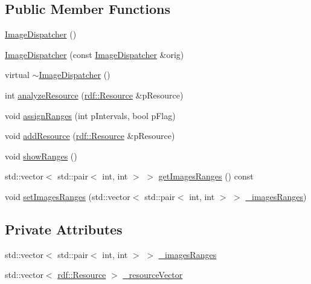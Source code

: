 \subsection*{Public Member Functions}
\begin{DoxyCompactItemize}
\item 
\hyperlink{classrdf_1_1ImageDispatcher_a32ca43231de0932370b3b5a98f76f5b5}{Image\+Dispatcher} ()
\item 
\hyperlink{classrdf_1_1ImageDispatcher_a75d599869487a60fcaf0269f77f2c049}{Image\+Dispatcher} (const \hyperlink{classrdf_1_1ImageDispatcher}{Image\+Dispatcher} \&orig)
\item 
virtual \hyperlink{classrdf_1_1ImageDispatcher_ab7a10dc991075876919a0d657251c808}{$\sim$\+Image\+Dispatcher} ()
\item 
int \hyperlink{classrdf_1_1ImageDispatcher_a0fe89ed7467fd34e1e24984b87d6d3bc}{analyze\+Resource} (\hyperlink{classrdf_1_1Resource}{rdf\+::\+Resource} \&p\+Resource)
\item 
void \hyperlink{classrdf_1_1ImageDispatcher_a10e89cb9630fe93877a23f485d2a1213}{assign\+Ranges} (int p\+Intervals, bool p\+Flag)
\item 
void \hyperlink{classrdf_1_1ImageDispatcher_a900b639d7be2ac5e4e48b5a7aa879182}{add\+Resource} (\hyperlink{classrdf_1_1Resource}{rdf\+::\+Resource} \&p\+Resource)
\item 
void \hyperlink{classrdf_1_1ImageDispatcher_ac78db12cfd581737ad8077e0af974c2b}{show\+Ranges} ()
\item 
std\+::vector$<$ std\+::pair$<$ int, int $>$ $>$ \hyperlink{classrdf_1_1ImageDispatcher_a1044b93dabc737e15045fc5c62970e7b}{get\+Images\+Ranges} () const 
\item 
void \hyperlink{classrdf_1_1ImageDispatcher_a989c61bb935fa54a0838bd2d49a51133}{set\+Images\+Ranges} (std\+::vector$<$ std\+::pair$<$ int, int $>$ $>$ \hyperlink{classrdf_1_1ImageDispatcher_a090ae3aa3b2e08ebc0432314ef519ae6}{\+\_\+images\+Ranges})
\end{DoxyCompactItemize}
\subsection*{Private Attributes}
\begin{DoxyCompactItemize}
\item 
std\+::vector$<$ std\+::pair$<$ int, int $>$ $>$ \hyperlink{classrdf_1_1ImageDispatcher_a090ae3aa3b2e08ebc0432314ef519ae6}{\+\_\+images\+Ranges}
\item 
std\+::vector$<$ \hyperlink{classrdf_1_1Resource}{rdf\+::\+Resource} $>$ \hyperlink{classrdf_1_1ImageDispatcher_aee49acec382a35bd2043e14f56dce8b1}{\+\_\+resource\+Vector}
\end{DoxyCompactItemize}


